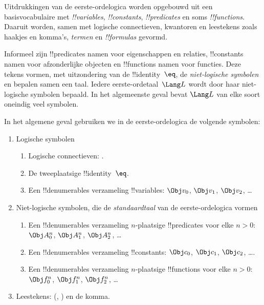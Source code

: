 \documentclass[openany]{memoir}
\begin{document}



Uitdrukkingen van de eerste-ordelogica worden opgebouwd uit een
basisvocabulaire met \emph{!!{variable}s}, \emph{!!{constant}s},
\emph{!!{predicate}s} en soms \emph{!!{function}s}. Daaruit worden,
samen met logische connectieven, kwantoren en leestekens zoals haakjes
en komma's, \emph{termen} en \emph{!!{formula}s} gevormd.

\begin{explain}
Informeel zijn !!{predicate}s namen voor eigenschappen en relaties,
!!{constant}s namen voor afzonderlijke objecten en !!{function}s namen
voor functies. Deze tekens vormen, met uitzondering van de
!!{identity}~$\eq$, de \emph{niet-logische symbolen} en bepalen samen
een taal. Iedere eerste-ordetaal~$\Lang L$ wordt door haar
niet-logische symbolen bepaald. In het algemeenste geval bevat
$\Lang L$ van elke soort oneindig veel symbolen.
\end{explain}

In het algemene geval gebruiken we in de eerste-ordelogica de volgende
symbolen:

\begin{enumerate}
\item Logische symbolen
\begin{enumerate}
\item Logische connectieven:
  \startycommalist
  .
\item De tweeplaatsige !!{identity}~$\eq$.
\item Een !!{denumerable}s verzameling !!{variable}s: $\Obj v_0$, $\Obj v_1$, $\Obj
  v_2$, \dots
\end{enumerate}
\item Niet-logische symbolen, die de \emph{standaardtaal} van de
  eerste-ordelogica vormen
\begin{enumerate}
\item Een !!{denumerable}s verzameling $n$-plaatsige !!{predicate}s voor elke $n>0$: $\Obj
  A^n_0$, $\Obj A^n_1$, $\Obj A^n_2$, \dots
\item Een !!{denumerable}s verzameling !!{constant}s: $\Obj c_0$, $\Obj c_1$, $\Obj
  c_2$, \dots.
\item Een !!{denumerable}s verzameling $n$-plaatsige !!{function}s voor elke $n>0$:
  $\Obj f^n_0$, $\Obj f^n_1$, $\Obj f^n_2$, \dots
\end{enumerate}
\item Leestekens: (, ) en de komma.
\end{enumerate}
\end{document}

